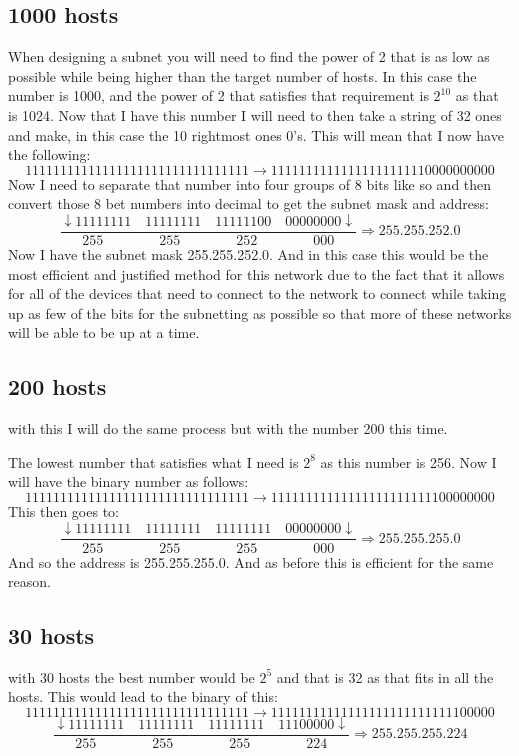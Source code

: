 \documentclass{article}
\begin{document}
\subsection{1000 hosts}
When designing a subnet you will need to find the power of 2 that is as low as possible while being higher than the target number of hosts. In this case the number is 1000, and the power of 2 that satisfies that requirement is $2^{10}$ as that is 1024. Now that I have this number I will need to then take a string of 32 ones and make, in this case the 10 rightmost ones 0's. This will mean that I now have the following:
\[
	11111111111111111111111111111111 \rightarrow 11111111111111111111110000000000
\]
Now I need to separate that number into four groups of 8 bits like so and then convert those 8 bet numbers into decimal to get the subnet mask and address:
\[
	\frac{\downarrow11111111\quad11111111\quad11111100\quad00000000\downarrow}{255 \qquad \qquad 255 \qquad \qquad 252 \qquad \qquad 000} \Rightarrow 255.255.252.0
\]
Now I have the subnet mask 255.255.252.0. And in this case this would be the most efficient and justified method for this network due to the fact that it allows for all of the devices that need to connect to the network to connect while taking up as few of the bits for the subnetting as possible so that more of these networks will be able to be up at a time. 
\subsection{200 hosts}
with this I will do the same process but with the number 200 this time. 
	
The lowest number that satisfies what I need is $2^{8}$ as this number is 256. Now I will have the binary number as follows:
\[
	11111111111111111111111111111111 \rightarrow 11111111111111111111111100000000
\]
This then goes to:
\[
	\frac{\downarrow11111111\quad11111111\quad11111111\quad00000000\downarrow}{255 \qquad \qquad 255 \qquad \qquad 255 \qquad \qquad 000} \Rightarrow 255.255.255.0
\]
And so the address is 255.255.255.0. And as before this is efficient for the same reason. 
\subsection{30 hosts}
with 30 hosts the best number would be $2^{5}$ and that is 32 as that fits in all the hosts. This would lead to the binary of this:
\[
	11111111111111111111111111111111 \rightarrow 11111111111111111111111111100000
\]
\[
	\frac{\downarrow 11111111 \quad 11111111 \quad 11111111 \quad 11100000 \downarrow}{255 \qquad \qquad 255 \qquad \qquad 255 \qquad \qquad 224} \Rightarrow 255.255.255.224
\]
\end{document}
